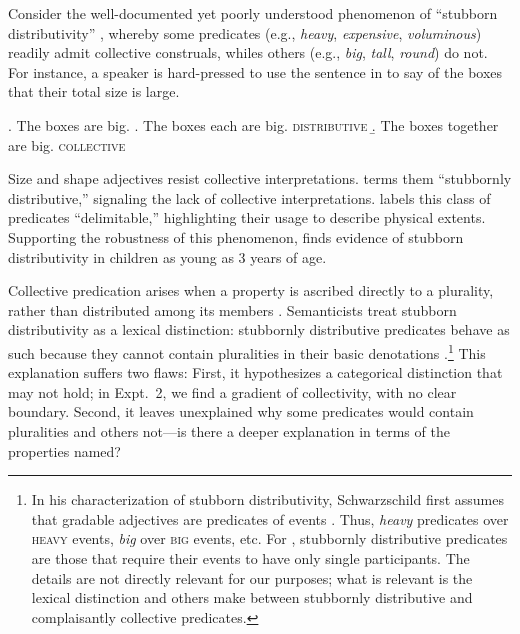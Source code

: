 \documentclass[preprint,12pt,authoryear,titlepage]{elsarticle}
\begin{document}
Consider the well-documented yet poorly understood phenomenon of ``stubborn distributivity'' \citep{quine1960,schwarzschild2011,vazquezrojas2012,zhang2013,syrett2015}, whereby some predicates (e.g., \emph{heavy}, \emph{expensive}, \emph{voluminous}) readily admit collective construals, whiles others (e.g., \emph{big}, \emph{tall}, \emph{round}) do not. 
For instance, a speaker is hard-pressed to use the sentence in \Next to say of the boxes that their total size is large.

\ex. The boxes are big.
\a. The boxes each are big. \hfill \textsc{distributive}
\b. The boxes together are big. \hfill {}\textsc{collective}

Size and shape adjectives 
resist collective interpretations. \cite{schwarzschild2011} terms them ``stubbornly distributive,'' signaling the lack of collective interpretations. \citet{zhang2013} labels this class of predicates ``delimitable,'' highlighting their usage to describe physical extents. Supporting the robustness of this phenomenon, \cite{syrett2015} finds evidence of stubborn distributivity in children as young as 3 years of age.

Collective predication arises when a property is ascribed directly to a plurality, rather than distributed among its members \citep{link1983}. Semanticists treat stubborn distributivity as a lexical distinction: stubbornly distributive predicates behave as such because they cannot contain pluralities in their basic denotations \citep{schwarzschild2011,vazquezrojas2012,zhang2013}.\footnote{In his characterization of stubborn distributivity, Schwarzschild first assumes that gradable adjectives are predicates of events \citep[e.g.,][]{higginbothamschein1989}. Thus, \emph{heavy} predicates over \textsc{heavy} events, \emph{big} over \textsc{big} events, etc. For \citeauthor{schwarzschild2011}, stubbornly distributive predicates are those that require their events to have only single participants. The details are not directly relevant for our purposes; what is relevant is the lexical distinction \citeauthor{schwarzschild2011} and others make between stubbornly distributive and complaisantly collective predicates.}
This explanation suffers two flaws:
First, it hypothesizes a categorical distinction that may not hold; in Expt.~2, we find a gradient of collectivity, with no clear boundary.
Second, it leaves unexplained why some predicates would contain pluralities and others not---is there a deeper explanation in terms of the properties named?
\end{document}
